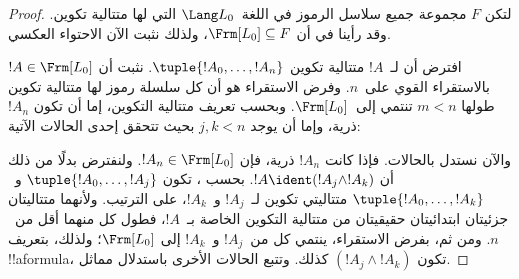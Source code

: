 \documentclass[../../../include/open-logic-section]{subfiles}
\begin{document}
\begin{proof}
لتكن $F$ مجموعة جميع سلاسل الرموز في اللغة~$\Lang L_0$ التي لها
متتالية تكوين. وقد رأينا في  أن
$\Frm[L_0] \subseteq F$، ولذلك نثبت الآن الاحتواء العكسي.

افترض أن لـ~$!A$ متتالية تكوين $\tuple{!A_0,\dotsc,!A_n}$.
نثبت أن $!A \in \Frm[L_0]$ بالاستقراء القوي على~$n$.
وفرض الاستقراء هو أن كل سلسلة رموز لها متتالية تكوين طولها
$m < n$ تنتمي إلى~$\Frm[L_0]$. وبحسب تعريف متتالية التكوين، إما أن
تكون $!A_n$ ذرية، وإما أن يوجد $j,k < n$ بحيث تتحقق إحدى الحالات
الآتية:
\begin{enumerate}
\end{enumerate}
والآن نستدل بالحالات. فإذا كانت $!A_n$ ذرية، فإن
$!A_n \in \Frm[L_0]$. ولنفترض بدلًا من ذلك أن $!A \ident
(!A_j \land !A_k)$. بحسب ، تكون
$\tuple{!A_0,\dotsc,!A_j}$ و~$\tuple{!A_0,\dotsc,!A_k}$ متتاليتي
تكوين لـ~$!A_j$ و~$!A_k$، على الترتيب. ولأنهما متتاليتان جزئيتان
ابتدائيتان حقيقيتان من متتالية التكوين الخاصة بـ~$!A$، فطول كل منهما
أقل من~$n$. ومن ثم، بفرض الاستقراء، ينتمي كل من~$!A_j$ و~$!A_k$ إلى
$\Frm[L_0]$؛ ولذلك، بتعريف !!a{formula}، تكون
$(!A_j \land !A_k)$ كذلك. وتتبع الحالات الأخرى باستدلال مماثل.
\end{proof}
\end{document}
